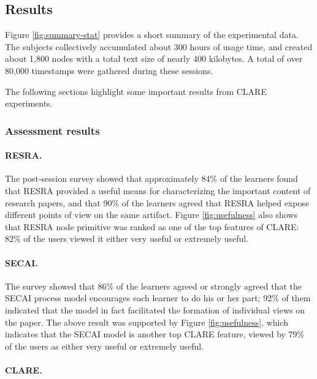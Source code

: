 \subsection{Results}
\label{sec:results}

Figure \ref{fig:summary-stat} provides a short summary of the experimental
data. The subjects collectively accumulated about 300 hours of usage time,
and created about 1,800 nodes with a total text size of nearly 400
kilobytes. A total of over 80,000 timestamps were gathered during these
sessions.

\begin{quotation}
\end{quotation}


The following sections highlight some important results from CLARE
experiments.


\subsubsection{Assessment results}

\paragraph{RESRA.}

The post-session survey showed that approximately 84\% of the learners
found that RESRA provided a useful means for characterizing the important
content of research papers, and that 90\% of the learners agreed that RESRA
helped expose different points of view on the same artifact. Figure
\ref{fig:usefulness} also shows that RESRA node primitive was ranked as one
of the top features of CLARE: 82\% of the users viewed it either very
useful or extremely useful.


\paragraph{SECAI.}

The survey showed that 86\% of the learners agreed or strongly agreed that
the SECAI process model encourages each learner to do his or her part; 92\%
of them indicated that the model in fact facilitated the formation of
individual views on the paper. The above result was supported by Figure
\ref{fig:usefulness}, which indicates that the SECAI model is another top
CLARE feature, viewed by 79\% of the users as either very useful or
extremely useful.


\paragraph{CLARE.}

